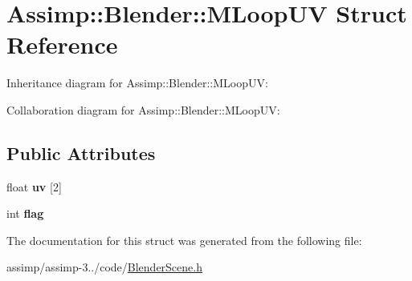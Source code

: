 \hypertarget{struct_assimp_1_1_blender_1_1_m_loop_u_v}{\section{Assimp\+:\+:Blender\+:\+:M\+Loop\+U\+V Struct Reference}
\label{struct_assimp_1_1_blender_1_1_m_loop_u_v}
}


Inheritance diagram for Assimp\+:\+:Blender\+:\+:M\+Loop\+U\+V\+:


Collaboration diagram for Assimp\+:\+:Blender\+:\+:M\+Loop\+U\+V\+:
\subsection*{Public Attributes}
\begin{DoxyCompactItemize}
\item 
\hypertarget{struct_assimp_1_1_blender_1_1_m_loop_u_v_a8e1443d516f2466e93ef7e01e718ae35}{float {\bfseries uv} \mbox{[}2\mbox{]}}\label{struct_assimp_1_1_blender_1_1_m_loop_u_v_a8e1443d516f2466e93ef7e01e718ae35}

\item 
\hypertarget{struct_assimp_1_1_blender_1_1_m_loop_u_v_ab39b0cb3e97012a5218391694261dae8}{int {\bfseries flag}}\label{struct_assimp_1_1_blender_1_1_m_loop_u_v_ab39b0cb3e97012a5218391694261dae8}

\end{DoxyCompactItemize}


The documentation for this struct was generated from the following file\+:\begin{DoxyCompactItemize}
\item 
assimp/assimp-\/3../code/\hyperlink{_blender_scene_8h}{Blender\+Scene.\+h}\end{DoxyCompactItemize}
